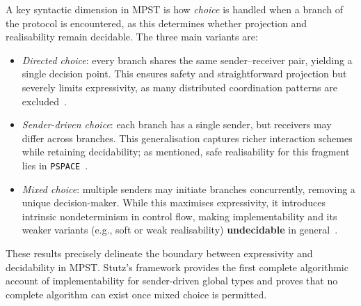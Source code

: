 A key syntactic dimension in MPST is how \emph{choice} is handled 
when a branch of the protocol is encountered, as this 
determines whether projection and realisability remain decidable.  
The three main variants are:
\begin{itemize}
    \item \emph{Directed choice}: every branch shares the same 
    sender–receiver pair, yielding a single decision point.  
    This ensures safety and straightforward projection but severely limits 
    expressivity, as many distributed coordination patterns are 
    excluded~\cite{honda2008multiparty}.  

    \item \emph{Sender-driven choice}: each branch has a single sender, 
    but receivers may differ across branches.  
    This generalisation captures richer interaction schemes while retaining 
    decidability; as mentioned, safe realisability for this fragment lies in 
    \verb|PSPACE|~\cite{stutz2024implementability}.  

    \item \emph{Mixed choice}: multiple senders may initiate branches 
    concurrently, removing a unique decision-maker.  
    While this maximises expressivity, it introduces intrinsic 
    nondeterminism in control flow, making implementability and its 
    weaker variants (e.g., soft or weak realisability) \textbf{undecidable} 
    in general~\cite{stutz2024implementability}.  
\end{itemize}

These results precisely delineate the boundary between expressivity and 
decidability in MPST.  
Stutz’s framework provides the first complete algorithmic account of 
implementability for sender-driven global types and proves that no 
complete algorithm can exist once mixed choice is permitted.


